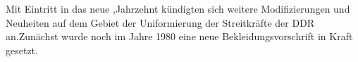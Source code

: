 

Mit Eintritt in das neue ,Jahrzehnt kündigten sich
weitere Modifizierungen und Neuheiten auf dem
Gebiet der Uniformierung der Streitkräfte der
DDR an.Zunächst wurde noch im Jahre 1980 eine
neue Bekleidungsvorschrift in Kraft gesetzt.